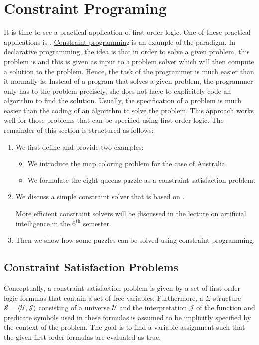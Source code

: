 \section{Constraint Programing}
It is time to see a practical application of first order logic.  One of these practical applications is .  
\href{https://en.wikipedia.org/wiki/Constraint_programming}{Constraint programming} is an example of the
  paradigm.  In declarative programming, the idea is that 
in order to solve a given problem, this problem is  and this  is
given as input to a problem solver which will then compute a solution to the problem.  Hence, the task of the
programmer is much easier than it normally is: Instead of  a program that solves a given problem,
the programmer only has to  the problem precisely, she does not have to explicitely code an algorithm to find the
solution.  Usually, the specification of a problem is much easier than the coding of an algorithm to solve the problem.  This approach works well for those problems
that can be specified using first order logic.  The remainder of this section is structured as follows:
\begin{enumerate}
\item We first define  and provide two examples:
      \begin{itemize}
      \item We introduce the map coloring problem for the case of Australia.
      \item We formulate the eight queens puzzle as a constraint satisfaction problem.  
      \end{itemize}
\item We discuss a simple constraint solver that is based on .

      More efficient constraint solvers will be discussed in the lecture on artificial intelligence in the
      $6^{\mathrm{th}}$ semester.
\item Then we show how some puzzles can be solved using constraint programming.
\end{enumerate}

\subsection{Constraint Satisfaction Problems}
Conceptually, a constraint satisfaction problem is given by a set of first order logic formulas that contain a
set of free variables.  Furthermore, a $\Sigma$-structure $\mathcal{S} = \langle \mathcal{U},
\mathcal{J}\rangle $
consisting of a universe $\mathcal{U}$ and the interpretation $\mathcal{J}$ of the function and predicate 
symbols used in these formulas is assumed to be implicitly specified by the context of the problem.  The goal is 
to find a variable assignment such that the given first-order formulas are evaluated as true.

